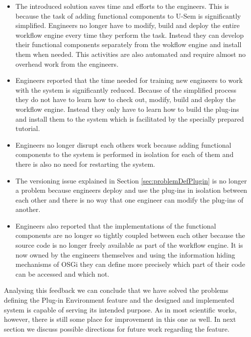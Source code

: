 \begin{itemize}
	\item The introduced solution saves time and efforts to the engineers. This is because the task of adding functional components to U-Sem is significantly simplified. Engineers no longer have to modify, build and deploy the entire workflow engine every time they perform the task. Instead they can develop their functional components separately from the wokflow engine and install them when needed. This activities are also automated and require almost no overhead work from the engineers. 
	
	\item Engineers reported that the time needed for training new engineers to work with the system is significantly reduced. Because of the simplified process they do not have to learn how to check out, modify, build and deploy the workflow engine. Instead they only have to learn how to build the plug-ins and install them to the system which is facilitated by the specially prepared tutorial.
	
	\item Engineers no longer disrupt each others work because adding functional components to the system is performed in isolation for each of them and there is also no need for restarting the system. 
	
	\item The versioning issue explained in Section \ref{sec:problemDefPlugin} is no longer a problem because engineers deploy and use the plug-ins in isolation between each other and there is no way that one engineer can modify the plug-ins of another.
	
	\item Engineers also reported that the implementations of the functional components are no longer so tightly coupled between each other because the source code is no longer freely available as part of the workflow engine. It is now owned by the engineers themselves and using the information hiding mechanisms of OSGi they can define more precisely which part of their code can be accessed and which not.
	 
\end{itemize} 

Analysing this feedback we can conclude that we have solved the problems defining the Plug-in Environment feature and the designed and implemented system is capable of serving its intended purpose. As in most scientific works, however, there is still some place for improvement in this one as well. In next section we discuss possible directions for future work regarding the feature.


